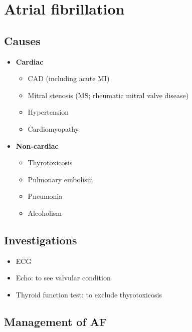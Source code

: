 \documentclass[
  12pt,
]{memoir}
\providecommand{\tightlist}{%
  \setlength{\itemsep}{0pt}\setlength{\parskip}{0pt}}
\begin{document}
\hypertarget{atrial-fibrillation}{%
\section{Atrial fibrillation}\label{atrial-fibrillation}}

\hypertarget{causes}{%
\subsection{Causes}\label{causes}}

\begin{itemize}
\tightlist
\item
  \textbf{Cardiac}

  \begin{itemize}
  \tightlist
  \item
    CAD (including acute MI)
  \item
    Mitral stenosis (MS; rheumatic mitral valve disease)
  \item
    Hypertension
  \item
    Cardiomyopathy
  \end{itemize}
\item
  \textbf{Non-cardiac}

  \begin{itemize}
  \tightlist
  \item
    Thyrotoxicosis
  \item
    Pulmonary embolism
  \item
    Pneumonia
  \item
    Alcoholism
  \end{itemize}
\end{itemize}

\hypertarget{investigations}{%
\subsection{Investigations}\label{investigations}}

\begin{itemize}
\tightlist
\item
  ECG
\item
  Echo: to see valvular condition
\item
  Thyroid function test: to exclude thyrotoxicosis
\end{itemize}

\hypertarget{management-of-af}{%
\subsection{Management of AF}\label{management-of-af}}
\end{document}
